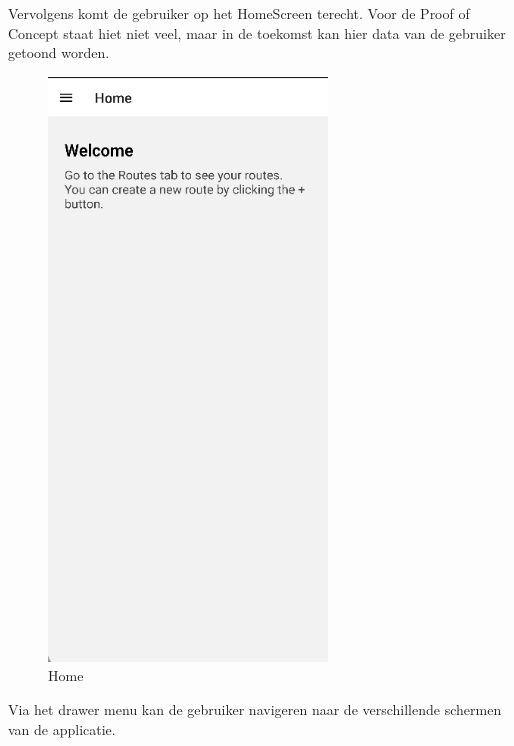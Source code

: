     Vervolgens komt de gebruiker op het HomeScreen terecht. Voor de Proof of Concept staat hiet niet veel, 
    maar in de toekomst kan hier data van de gebruiker getoond worden.

    \begin{figure}[htbp]
        \includegraphics[width=20em]{./graphics/home.png}
        \centering
        \caption{Home}
        \label{fig:home}
    \end{figure}

    Via het drawer menu kan de gebruiker navigeren naar de verschillende schermen van de applicatie.

